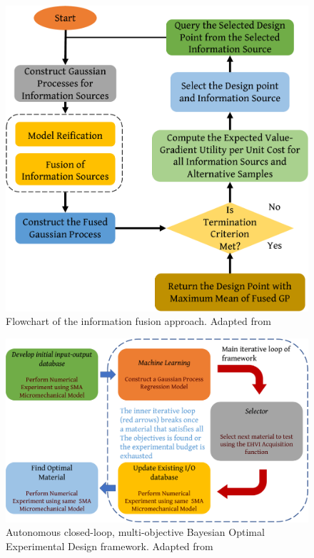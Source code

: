 \documentclass[utf8]{frontiersSCNS} %
\begin{document}
\begin{figure}[!]
\centering
\includegraphics[scale=0.5]{./figures/information_fusion_flowchart}
\caption{Flowchart of the information fusion approach. Adapted from \cite{ghoreishi2018multi}}
\label{fig:04}
\end{figure}

\begin{figure}[!]
\centering
\includegraphics[scale=0.4]{./figures/Multi_objective_BO}
\caption{Autonomous closed-loop, multi-objective Bayesian Optimal Experimental Design framework. Adapted from \cite{solomou2018multi}}
\label{fig:05}
\end{figure}
\end{document}
